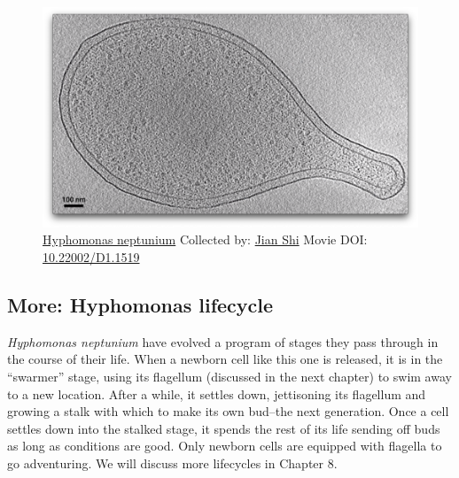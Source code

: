 \documentclass[]{tufte-book}
\begin{document}
\begin{figure}
\includegraphics{movie_stills/5_3a} \caption[\protect\hyperlink{tree}{Hyphomonas neptunium} Collected by:
\protect\hyperlink{jian_shi}{Jian Shi} Movie DOI:
\href{https://doi.org/10.22002/D1.1519}{10.22002/D1.1519}]{\protect\hyperlink{tree}{Hyphomonas neptunium} Collected by:
\protect\hyperlink{jian_shi}{Jian Shi} Movie DOI:
\href{https://doi.org/10.22002/D1.1519}{10.22002/D1.1519}}\label{fig:5-3a}
\end{figure}

\hypertarget{Hyphomonas_lifecycle}{\subsection*{More: Hyphomonas
lifecycle}\label{Hyphomonas_lifecycle}}

\emph{Hyphomonas neptunium} have evolved a program of stages they pass
through in the course of their life. When a newborn cell like this one
is released, it is in the ``swarmer'' stage, using its flagellum
(discussed in the next chapter) to swim away to a new location. After a
while, it settles down, jettisoning its flagellum and growing a stalk
with which to make its own bud--the next generation. Once a cell settles
down into the stalked stage, it spends the rest of its life sending off
buds as long as conditions are good. Only newborn cells are equipped
with flagella to go adventuring. We will discuss more lifecycles in
Chapter 8.
\end{document}
